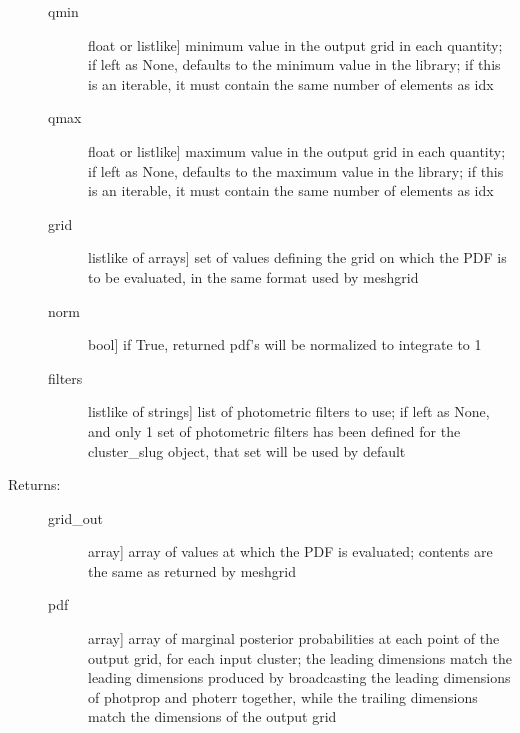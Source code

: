 \documentclass[letterpaper,10pt,english]{sphinxmanual}
\begin{document}
\begin{fulllineitems}
\begin{fulllineitems}
\begin{description}
\begin{description}
\item[{qmin}] \leavevmode{[}float or listlike{]}
minimum value in the output grid in each quantity; if
left as None, defaults to the minimum value in the
library; if this is an iterable, it must contain the
same number of elements as idx

\item[{qmax}] \leavevmode{[}float or listlike{]}
maximum value in the output grid in each quantity; if
left as None, defaults to the maximum value in the
library; if this is an iterable, it must contain the
same number of elements as idx

\item[{grid}] \leavevmode{[}listlike of arrays{]}
set of values defining the grid on which the PDF is to
be evaluated, in the same format used by meshgrid

\item[{norm}] \leavevmode{[}bool{]}
if True, returned pdf's will be normalized to integrate
to 1

\item[{filters}] \leavevmode{[}listlike of strings{]}
list of photometric filters to use; if left as None, and
only 1 set of photometric filters has been defined for
the cluster\_slug object, that set will be used by
default

\end{description}

\item[{Returns:}] \leavevmode\begin{description}
\item[{grid\_out}] \leavevmode{[}array{]}
array of values at which the PDF is evaluated; contents
are the same as returned by meshgrid

\item[{pdf}] \leavevmode{[}array{]}
array of marginal posterior probabilities at each point
of the output grid, for each input cluster; the leading
dimensions match the leading dimensions produced by
broadcasting the leading dimensions of photprop and
photerr together, while the trailing dimensions match
the dimensions of the output grid

\end{description}

\end{description}

\end{fulllineitems}



\end{fulllineitems}
\end{document}
